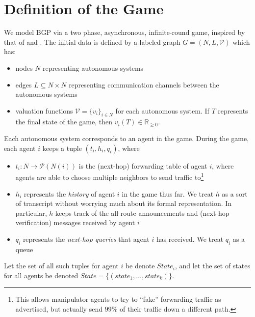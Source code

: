 \documentclass[12pt]{article}
\newcommand{\R}{\mathbb{R}}
\begin{document}
{}


\clearpage
\appendix

\section{Definition of the Game}
  We  model BGP via a two phase, asynchronous, infinite-round game,
  inspired by that of \cite{RoutingGames} and \cite{Attraction}.
  The initial data is defined by a labeled graph $G = (N,L,\mathcal V)$ which has:
  \begin{itemize}
    \item nodes $N$ representing autonomous systems
    \item edges $L \subseteq N\times N$ representing communication channels
      between the autonomous systems
    \item valuation functions $\mathcal V = \{v_i\}_{i\in N}$ for each 
      autonomous system. If $T$ represents the final state of the game,
      then $v_i(T) \in \R_{\ge 0}$.
  \end{itemize}
  Each autonomous system corresponds to an agent in the game.
  During the game, each agent $i$ keeps a tuple $(t_i, h_i, q_i)$, where
  \begin{itemize}
    \item $t_i : N \to \mathcal P (N(i))$ is the (next-hop)
      forwarding table of agent $i$, where agents are able to choose multiple
      neighbors to send traffic to\footnote{
        This allows manipulator agents to try to ``fake'' forwarding traffic
        as advertised, but actually send $99\%$ of their traffic down a different
        path.
      }
    \item $h_i$ represents the \emph{history} of agent $i$ in the game thus far.
      We treat $h$ as a sort of transcript without worrying much about its
      formal representation. In particular, $h$ keeps track of the all
      route announcements and (next-hop verification) messages received by
      agent $i$
    \item $q_i$ represents the \emph{next-hop queries} that agent $i$ has
      received. We treat $q_i$ as a queue
  \end{itemize}
  Let the set of all such tuples for agent $i$ be denote $State_i$,
  and let the set of states for all agents be denoted
  $State = \{(state_1,\ldots, state_k)\}$.
\end{document}
